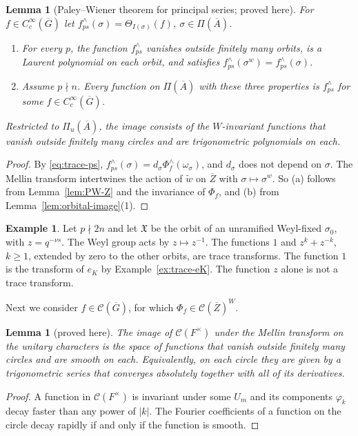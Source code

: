 \documentclass[12pt,letterpaper]{article}
\numberwithin{equation}{section}
\newtheorem{lemma}[theorem]{Lemma}
\theoremstyle{definition}
\newtheorem{xexample}[theorem]{Example}
\newcommand{\proved}{proved here}
\newcommand{\bG}{\overline{G}}
\newcommand{\bA}{\overline{A}}
\newcommand{\bZ}{\overline{Z}}
\newcommand{\wt}{\tilde w}
\newcommand{\calC}{\mathcal C}
\newcommand{\fX}{\mathfrak X}
\begin{document}
\begin{lemma}[Paley--Wiener theorem for principal series; \proved]\label{lem:PWps}
For $f\in C_c^\infty(\bG)$ let $f^\wedge_{ps}(\sigma)=\Theta_{I(\sigma)}(f)$, $\sigma\in\Pi(\bA)$.
\begin{enumerate}[label=(\alph*),leftmargin=*,itemsep=1pt]
\item For every $p$, the function $f^\wedge_{ps}$ vanishes outside finitely many orbits, is a
Laurent polynomial on each orbit, and satisfies $f^\wedge_{ps}(\sigma^w)=f^\wedge_{ps}(\sigma)$.
\item Assume $p\nmid n$.  Every function on $\Pi(\bA)$ with these three properties is
$f^\wedge_{ps}$ for some $f\in C_c^\infty(\bG)$.
\end{enumerate}
Restricted to $\Pi_u(\bA)$, the image consists of the $W$-invariant functions that vanish
outside finitely many circles and are trigonometric polynomials on each.
\end{lemma}
\begin{proof}
By \eqref{eq:trace-ps}, $f^\wedge_{ps}(\sigma)=d_\sigma\Phi_f^\wedge(\omega_\sigma)$, and
$d_\sigma$ does not depend on $\sigma$.  The Mellin transform intertwines the action of
$\wt$ on $\bZ$ with $\sigma\mapsto\sigma^w$.  So (a) follows from Lemma~\ref{lem:PW-Z} and the
invariance of $\Phi_f$, and (b) from Lemma~\ref{lem:orbital-image}(1).
\end{proof}

\begin{xexample}\label{ex:PWps}
Let $p\nmid 2n$ and let $\fX$ be the orbit of an unramified Weyl-fixed $\sigma_0$, with
$z=q^{-\nu s}$.  The Weyl group acts by $z\mapsto z^{-1}$.  The functions $1$ and
$z^k+z^{-k}$, $k\ge1$, extended by zero to the other orbits, are trace transforms.  The
function $1$ is the transform of $e_K$ by Example~\ref{ex:trace-eK}.  The function $z$
alone is not a trace transform.
\end{xexample}

Next we consider $f\in\calC(\bG)$, for which $\Phi_f\in\calC(\bZ)^W$.

\begin{lemma}[\proved]\label{lem:SPW-Fx}
The image of $\calC(F^\times)$ under the Mellin transform on the unitary characters is the
space of functions that vanish outside finitely many circles and are smooth on each.
Equivalently, on each circle they are given by a trigonometric series that converges
absolutely together with all of its derivatives.
\end{lemma}
\begin{proof}
A function in $\calC(F^\times)$ is invariant under some $U_m$ and its components
$\varphi_k$ decay faster than any power of $|k|$.  The Fourier coefficients of a function
on the circle decay rapidly if and only if the function is smooth.
\end{proof}
\end{document}
